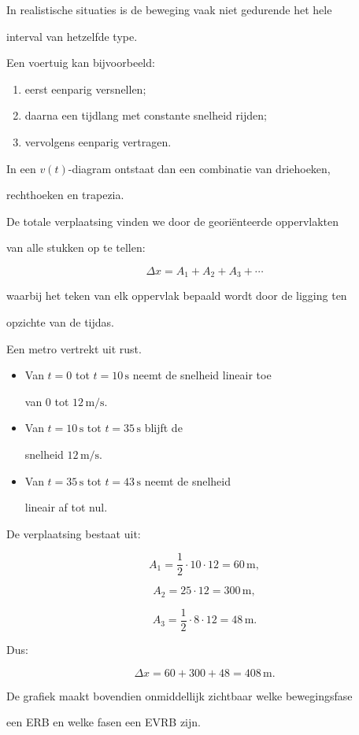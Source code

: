\documentclass{ximera}
\begin{document}

In realistische situaties is de beweging vaak niet gedurende het hele

interval van hetzelfde type.

Een voertuig kan bijvoorbeeld:

\begin{enumerate}

 \item eerst eenparig versnellen;

 \item daarna een tijdlang met constante snelheid rijden;

 \item vervolgens eenparig vertragen.

\end{enumerate}

In een $v(t)$-diagram ontstaat dan een combinatie van driehoeken,

rechthoeken en trapezia.

De totale verplaatsing vinden we door de georiënteerde oppervlakten

van alle stukken op te tellen:

\[\boxed{ \Delta x=A_1+A_2+A_3+\cdots }\]

waarbij het teken van elk oppervlak bepaald wordt door de ligging ten

opzichte van de tijdas.

\begin{voorbeeld}

Een metro vertrekt uit rust.

\begin{itemize}

 \item Van $t=0$ tot $t=10\,\mathrm{s}$ neemt de snelheid lineair toe

    van $0$ tot $12\,\mathrm{m/s}$.

 \item Van $t=10\,\mathrm{s}$ tot $t=35\,\mathrm{s}$ blijft de

    snelheid $12\,\mathrm{m/s}$.

 \item Van $t=35\,\mathrm{s}$ tot $t=43\,\mathrm{s}$ neemt de snelheid

    lineair af tot nul.

\end{itemize}

De verplaatsing bestaat uit:

\[A_1=\frac12\cdot10\cdot12=60\,\mathrm{m},\]

\[A_2=25\cdot12=300\,\mathrm{m},\]

\[A_3=\frac12\cdot8\cdot12=48\,\mathrm{m}.\]

Dus:

\[\boxed{ \Delta x=60+300+48=408\,\mathrm{m}. }\]

De grafiek maakt bovendien onmiddellijk zichtbaar welke bewegingsfase

een ERB en welke fasen een EVRB zijn.

\end{voorbeeld}
\end{document}
